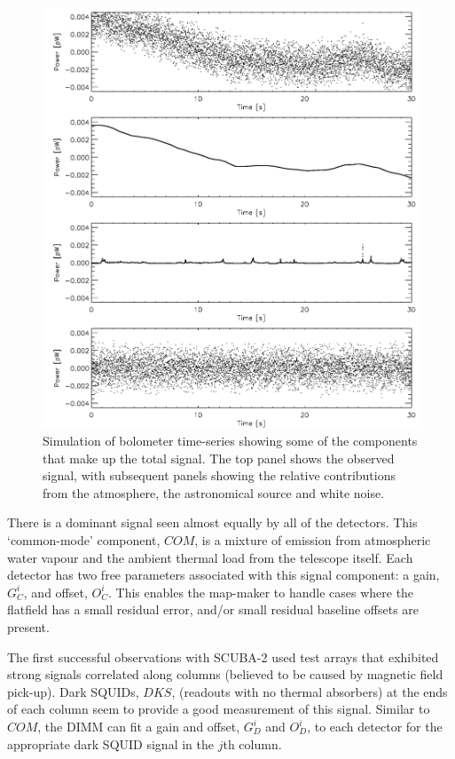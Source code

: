 \documentclass[oneside,11pt]{starlink}
\begin{document}
\begin{figure}[htb]
  \begin{center}
    \includegraphics[width=0.76\linewidth]{sun258_signalcpts}
    \caption{Simulation of bolometer time-series showing some of the
      components that make up the total signal. The top panel shows
      the observed signal, with subsequent panels showing the relative
      contributions from the atmosphere, the astronomical source and
      white noise.}
    \label{fig:comps}
  \end{center}
\end{figure}

There is a dominant signal seen almost equally by all of the
detectors. This `common-mode' component, $COM$, is a mixture of
emission from atmospheric water vapour and the ambient thermal load
from the telescope itself. Each detector has two free parameters
associated with this signal component: a gain, $G_C^i$, and offset,
$O_C^i$. This enables the map-maker to handle cases where the
flatfield has a small residual error, and/or small residual baseline
offsets are present.

The first successful observations with SCUBA-2 used test arrays that
exhibited strong signals correlated along columns (believed to be
caused by magnetic field pick-up). Dark SQUIDs, $DKS$, (readouts with
no thermal absorbers) at the ends of
each
column seem to provide
a good measurement of this signal. Similar to $COM$, the DIMM can fit
a gain and offset, $G_D^i$ and $O_D^i$, to each detector for the
appropriate dark SQUID signal in the $j$th column.
\end{document}
